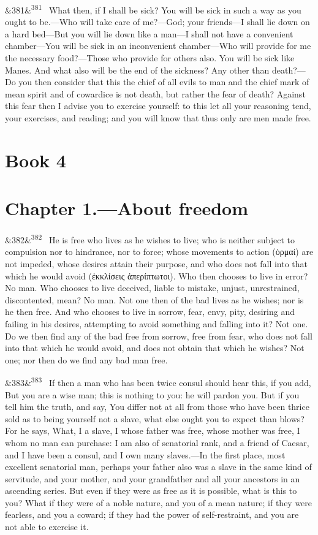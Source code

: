 \documentclass[12pt]{article}
\newcommand{\para}[1][]{\par\noindent\ifx&#1&\else\textsuperscript{\footnotesize #1}~\fi}
\begin{document}
\para[381] What then, if I shall be sick? You will be sick in such a way as you ought to be.—Who will take care of me?—God; your friends—I shall lie down on a hard bed—But you will lie down like a man—I shall not have a convenient chamber—You will be sick in an inconvenient chamber—Who will provide for me the necessary food?—Those who provide for others also. You will be sick like Manes. And what also will be the end of the sickness? Any other than death?—Do you then consider that this the chief of all evils to man and the chief mark of mean spirit and of cowardice is not death, but rather the fear of death? Against this fear then I advise you to exercise yourself: to this let all your reasoning tend, your exercises, and reading; and you will know that thus only are men made free.

\section*{Book 4}

\section*{Chapter 1.---About freedom}

\para[382] He is free who lives as he wishes to live; who is neither subject to compulsion nor to hindrance, nor to force; whose movements to action (ὁρμαί) are not impeded, whose desires attain their purpose, and who does not fall into that which he would avoid (ἐκκλίσεις ἀπερίπτωτοι). Who then chooses to live in error? No man. Who chooses to live deceived, liable to mistake, unjust, unrestrained, discontented, mean? No man. Not one then of the bad lives as he wishes; nor is he then free. And who chooses to live in sorrow, fear, envy, pity, desiring and failing in his desires, attempting to avoid something and falling into it? Not one. Do we then find any of the bad free from sorrow, free from fear, who does not fall into that which he would avoid, and does not obtain that which he wishes? Not one; nor then do we find any bad man free.

\para[383] If then a man who has been twice consul should hear this, if you add, But you are a wise man; this is nothing to you: he will pardon you. But if you tell him the truth, and say, You differ not at all from those who have been thrice sold as to being yourself not a slave, what else ought you to expect than blows? For he says, What, I a slave, I whose father was free, whose mother was free, I whom no man can purchase: I am also of senatorial rank, and a friend of Caesar, and I have been a consul, and I own many slaves.—In the first place, most excellent senatorial man, perhaps your father also was a slave in the same kind of servitude, and your mother, and your grandfather and all your ancestors in an ascending series. But even if they were as free as it is possible, what is this to you? What if they were of a noble nature, and you of a mean nature; if they were fearless, and you a coward; if they had the power of self-restraint, and you are not able to exercise it.
\end{document}
